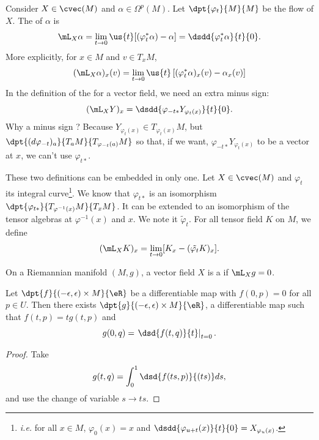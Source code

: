 Consider $X\in\cvec(M)$ and $\alpha\in\Omega^p(M)$. Let $\dpt{\varphi_t}{M}{M}$ be the flow of $X$. The  of $\alpha$ is
\begin{equation}\label{liesurforme}
	\mL_X\alpha=\lim_{t\to 0}\us{t}[(\varphi^*_t\alpha)-\alpha]=\dsdd{\varphi^*_t\alpha}{t}{0}.
\end{equation}
More explicitly, for $x\in M$ and $v\in T_xM$,
\[
	(\mL_X\alpha)_x(v)=\lim_{t\to 0}\us{t}\left[(\varphi_t^*\alpha)_x(v)-\alpha_x(v)\right]
\]
In the definition of the  for a vector field, we need an extra minus sign:
\begin{equation}		\label{EqDefLieDerivativeVect}
	(\mL_XY)_x=\dsdd{\varphi_{-t*}Y_{\varphi_t(x)}}{t}{0}.
\end{equation}
Why a minus sign ? Because $Y_{\varphi_t(x)}\in T_{\varphi_t(x)}M$, but $\dpt{(d\varphi_{-t})_a}{T_aM}{T_{\varphi_{-t}(a)}M}$ so that, if we want, $\varphi_{-t*}Y_{\varphi_t(x)}$ to be a vector at $x$, we can't use $\varphi_{t*}$.

These two definitions can be embedded in only one. Let $X\in\cvec(M)$ and $\varphi_t$ its integral curve\footnote{\textit{i.e.} for all $x\in M$, $\varphi_0(x)=x$ and $\dsdd{\varphi_{u+t}(x)}{t}{0}=X_{\varphi_u(x)}$.}. We know that $\varphi_{t*}$ is an isomorphism $\dpt{\varphi_{t*}}{T_{\varphi^{-1}(x)}M}{T_xM}$. It can be extended to an isomorphism of the tensor algebras at $\varphi^{-1}(x)$ and $x$. We note it $\tilde{\varphi}_t$. For all tensor field $K$ on $M$, we define
\[
	(\mL_XK)_x=\lim_{t\to 0}[K_x-(\tilde{\varphi_t}K)_x].
\]

On a Riemannian manifold $(M,g)$, a vector field $X$ is a  if $\mL_Xg=0$.



\begin{lemma}		\label{LEMooTQZGooOyESRA}
	Let $\dpt{f}{(-\epsilon,\epsilon)\times M}{\eR}$ be a differentiable map with $f(0,p)=0$ for all $p\in U$. Then there exists $\dpt{g}{(-\epsilon,\epsilon)\times M}{\eR}$, a differentiable map such that $f(t,p)=tg(t,p)$ and
	\[
		g(0,q)=\left.\dsd{f(t,q)}{t}\right|_{t=0}.
	\]
\end{lemma}
\begin{proof}
	Take
	\[
		g(t,q)=\int_0^1\dsd{f(ts,p)}{(ts)}ds,
	\]
	and use the change of variable $s\to ts$.
\end{proof}

